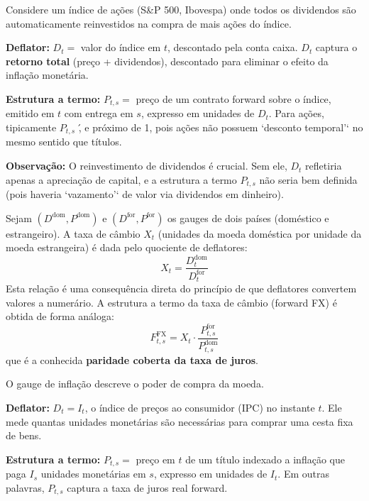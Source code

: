 \begin{ex}\label{ex:equity_index}
Considere um \'indice de a\c{c}\~oes (S\&P 500, Ibovespa) onde todos
os dividendos s\~ao automaticamente reinvestidos na compra de mais a\c{c}\~oes
do \'indice.

\noindent\textbf{Deflator:} $D_t =$ valor do \'indice em $t$,
descontado pela conta caixa. $D_t$ captura o \textbf{retorno total}
(pre\c{c}o + dividendos), descontado para eliminar o efeito da
infla\c{c}\~ao monet\'aria.

\noindent\textbf{Estrutura a termo:} $P_{t,s} =$ pre\c{c}o de um
contrato forward sobre o \'indice, emitido em $t$ com entrega em $s$,
expresso em unidades de $D_t$. Para a\c{c}\~oes, tipicamente $P_{t,s}$
\', e pr\'oximo de 1, pois a\c{c}\~oes n\~ao possuem `desconto
temporal'` no mesmo sentido que t\'itulos.

\noindent\textbf{Observa\c{c}\~ao:} O reinvestimento de dividendos \'e
crucial. Sem ele, $D_t$ refletiria apenas a aprecia\c{c}\~ao de
capital, e a estrutura a termo $P_{t,s}$ n\~ao seria bem definida
(pois haveria `vazamento'` de valor via dividendos em dinheiro).
\end{ex}

\begin{ex}\label{ex:fx}
Sejam $(D^{\text{dom}}, P^{\text{dom}})$ e $(D^{\text{for}},
P^{\text{for}})$ os gauges de dois pa\'ises (dom\'estico e estrangeiro).
A taxa de c\^ambio $X_t$ (unidades da moeda dom\'estica por unidade da
moeda estrangeira) \'e dada pelo quociente de deflatores:
\[
X_t = \frac{D_t^{\text{dom}}}{D_t^{\text{for}}}
\]
Esta rela\c{c}\~ao \'e uma consequ\^encia direta do princ\'ipio de
que deflatores convertem valores a numer\'ario. A estrutura a termo da
taxa de c\^ambio (forward FX) \'e obtida de forma an\'aloga:
\[
F_{t,s}^{\text{FX}} = X_t \cdot \frac{P_{t,s}^{\text{for}}}{P_{t,s}^{\text{dom}}}
\]
que \'e a conhecida \textbf{paridade coberta da taxa de juros}.
\end{ex}

\begin{ex}[Infla\c{c}\~ao]\label{ex:inflation}
O gauge de infla\c{c}\~ao descreve o poder de compra da moeda.

\noindent\textbf{Deflator:} $D_t = I_t$, o \'indice de pre\c{c}os ao
consumidor (IPC) no instante $t$. Ele mede quantas unidades monet\'arias
s\~ao necess\'arias para comprar uma cesta fixa de bens.

\noindent\textbf{Estrutura a termo:} $P_{t,s} =$ pre\c{c}o em $t$ de
um t\'itulo indexado a infla\c{c}\~ao que paga $I_s$ unidades
monet\'arias em $s$, expresso em unidades de $I_t$. Em outras
palavras, $P_{t,s}$ captura a taxa de juros real forward.
\end{ex}

